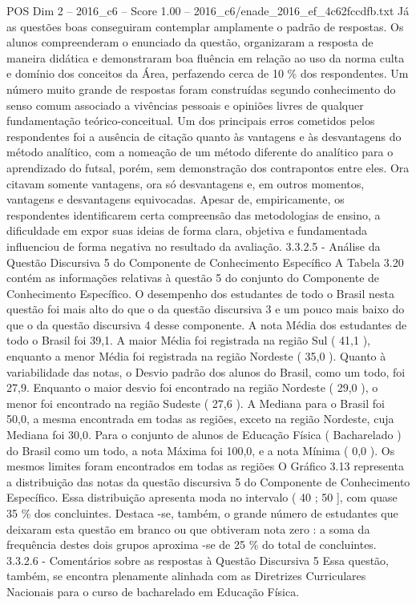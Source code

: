 \begin{textsample}{POS Dim 2 – 2016\_c6 – Score 1.00 – 2016\_c6/enade\_2016\_ef\_4c62fccdfb.txt}
Já as questões boas conseguiram contemplar amplamente o padrão de respostas.
Os alunos compreenderam o enunciado da questão, organizaram a resposta de maneira didática e demonstraram boa fluência em relação ao uso da norma culta e domínio dos conceitos da Área, perfazendo cerca de 10 \% dos respondentes.
Um número muito grande de respostas foram construídas segundo conhecimento do senso comum associado a vivências pessoais e opiniões livres de qualquer fundamentação teórico-conceitual.
Um dos principais erros cometidos pelos respondentes foi a ausência de citação quanto às vantagens e às desvantagens do método analítico, com a nomeação de um método diferente do analítico para o aprendizado do futsal, porém, sem demonstração dos contrapontos entre eles.
Ora citavam somente vantagens, ora só desvantagens e, em outros momentos, vantagens e desvantagens equivocadas.
Apesar de, empiricamente, os respondentes identificarem certa compreensão das metodologias de ensino, a dificuldade em expor suas ideias de forma clara, objetiva e fundamentada influenciou de forma negativa no resultado da avaliação. 3.3.2.5 - Análise da Questão Discursiva 5 do Componente de Conhecimento Específico A Tabela 3.20 contém as informações relativas à questão 5 do conjunto do Componente de Conhecimento Específico.
O desempenho dos estudantes de todo o Brasil nesta questão foi mais alto do que o da questão discursiva 3 e um pouco mais baixo do que o da questão discursiva 4 desse componente.
A nota Média dos estudantes de todo o Brasil foi 39,1.
A maior Média foi registrada na região Sul ( 41,1 ), enquanto a menor Média foi registrada na região Nordeste ( 35,0 ).
Quanto à variabilidade das notas, o Desvio padrão dos alunos do Brasil, como um todo, foi 27,9.
Enquanto o maior desvio foi encontrado na região Nordeste ( 29,0 ), o menor foi encontrado na região Sudeste ( 27,6 ).
A Mediana para o Brasil foi 50,0, a mesma encontrada em todas as regiões, exceto na região Nordeste, cuja Mediana foi 30,0.
Para o conjunto de alunos de Educação Física ( Bacharelado ) do Brasil como um todo, a nota Máxima foi 100,0, e a nota Mínima ( 0,0 ).
Os mesmos limites foram encontrados em todas as regiões O Gráfico 3.13 representa a distribuição das notas da questão discursiva 5 do Componente de Conhecimento Específico.
Essa distribuição apresenta moda no intervalo ( 40 ; 50 ], com quase 35 \% dos concluintes.
Destaca -se, também, o grande número de estudantes que deixaram esta questão em branco ou que obtiveram nota zero : a soma da frequência destes dois grupos aproxima -se de 25 \% do total de concluintes. 3.3.2.6 - Comentários sobre as respostas à Questão Discursiva 5 Essa questão, também, se encontra plenamente alinhada com as Diretrizes Curriculares Nacionais para o curso de bacharelado em Educação Física.

\end{textsample}
